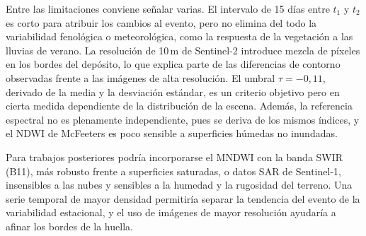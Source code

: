\documentclass[12pt]{article}
\begin{document}
Entre las limitaciones conviene señalar varias. El intervalo de 15 días entre $t_1$ y $t_2$ es corto para atribuir los cambios al evento, pero no elimina del todo la variabilidad fenológica o meteorológica, como la respuesta de la vegetación a las lluvias de verano. La resolución de 10\,m de Sentinel-2 introduce mezcla de píxeles en los bordes del depósito, lo que explica parte de las diferencias de contorno observadas frente a las imágenes de alta resolución. El umbral $\tau=-0{,}11$, derivado de la media y la desviación estándar, es un criterio objetivo pero en cierta medida dependiente de la distribución de la escena. Además, la referencia espectral no es plenamente independiente, pues se deriva de los mismos índices, y el NDWI de McFeeters es poco sensible a superficies húmedas no inundadas.

Para trabajos posteriores podría incorporarse el MNDWI con la banda SWIR (B11), más robusto frente a superficies saturadas, o datos SAR de Sentinel-1, insensibles a las nubes y sensibles a la humedad y la rugosidad del terreno. Una serie temporal de mayor densidad permitiría separar la tendencia del evento de la variabilidad estacional, y el uso de imágenes de mayor resolución ayudaría a afinar los bordes de la huella.
\end{document}

